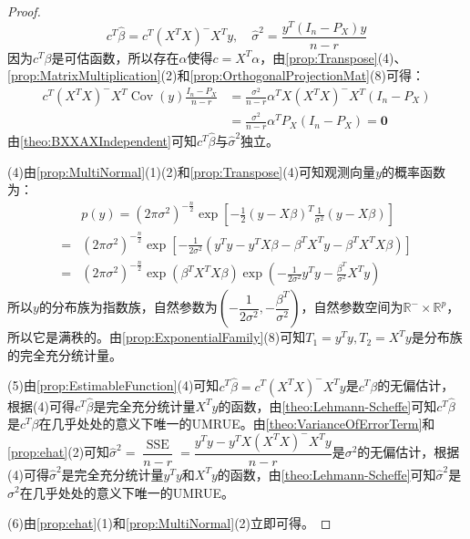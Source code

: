 \begin{proof}
	\begin{equation*}
		c^T\hat{\beta}=c^T(X^TX)^-X^Ty,\quad\hat{\sigma}^2=\frac{y^T(I_n-P_X)y}{n-r}
	\end{equation*}
	因为$c^T\beta$是可估函数，所以存在$\alpha$使得$c=X^T\alpha$，由\cref{prop:Transpose}(4)、\cref{prop:MatrixMultiplication}(2)和\cref{prop:OrthogonalProjectionMat}(8)可得：
	\begin{align*}
		c^T(X^TX)^-X^T\operatorname{Cov}(y)\frac{I_n-P_X}{n-r}&=\frac{\sigma^2}{n-r}\alpha^TX(X^TX)^-X^T(I_n-P_X) \\
		&=\frac{\sigma^2}{n-r}\alpha^TP_X(I_n-P_X)=\mathbf{0}
	\end{align*}
	由\cref{theo:BXXAXIndependent}可知$c^T\hat{\beta}$与$\hat{\sigma}^2$独立。\par
	(4)由\cref{prop:MultiNormal}(1)(2)和\cref{prop:Transpose}(4)可知观测向量$y$的概率函数为：
	\begin{align*}
		&p(y)=(2\pi\sigma^2)^{-\frac{n}{2}}\exp\left[-\frac{1}{2}(y-X\beta)^T\frac{1}{\sigma^2}(y-X\beta)\right] \\
		=&(2\pi\sigma^2)^{-\frac{n}{2}}\exp\left[-\frac{1}{2\sigma^2}(y^Ty-y^TX\beta-\beta^TX^Ty-\beta^TX^TX\beta)\right] \\
		=&(2\pi\sigma^2)^{-\frac{n}{2}}\exp(\beta^TX^TX\beta)\exp\left(-\frac{1}{2\sigma^2}y^Ty-\frac{\beta^T}{\sigma^2}X^Ty\right)
	\end{align*}
	所以$y$的分布族为指数族，自然参数为$\left(-\dfrac{1}{2\sigma^2},-\dfrac{\beta^T}{\sigma^2}\right)$，自然参数空间为$\mathbb{R}^{-}\times\mathbb{R}^{p}$，所以它是满秩的。由\cref{prop:ExponentialFamily}(8)可知$T_1=y^Ty,T_2=X^Ty$是分布族的完全充分统计量。\par
	(5)由\cref{prop:EstimableFunction}(4)可知$c^T\hat{\beta}=c^T(X^TX)^-X^Ty$是$c^T\beta$的无偏估计，根据(4)可得$c^T\hat{\beta}$是完全充分统计量$X^Ty$的函数，由\cref{theo:Lehmann-Scheffe}可知$c^T\hat{\beta}$是$c^T\beta$在几乎处处的意义下唯一的UMRUE。由\cref{theo:VarianceOfErrorTerm}和\cref{prop:ehat}(2)可知$\hat{\sigma}^2=\dfrac{\operatorname{SSE}}{n-r}=\dfrac{y^Ty-y^TX(X^TX)^-X^Ty}{n-r}$是$\sigma^2$的无偏估计，根据(4)可得$\hat{\sigma}^2$是完全充分统计量$y^Ty$和$X^Ty$的函数，由\cref{theo:Lehmann-Scheffe}可知$\hat{\sigma}^2$是$\sigma^2$在几乎处处的意义下唯一的UMRUE。\par
	(6)由\cref{prop:ehat}(1)和\cref{prop:MultiNormal}(2)立即可得。
\end{proof}

